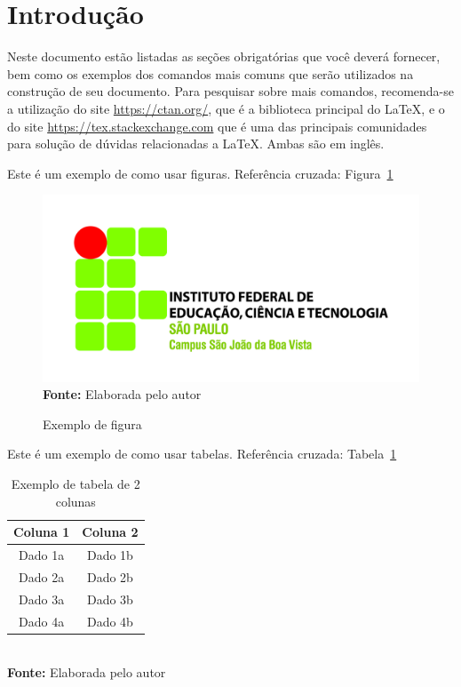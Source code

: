 \documentclass[
	article,			%
	11pt,				%
	oneside,			%
	a4paper,			%
	chapter=TITLE,		%
	section=TITLE,		%
	english,			%
	brazil,				%
	sumario=tradicional
]{abntex2}
\begin{document}
	\section{Introdução}
	
    Neste documento estão listadas as seções obrigatórias que você deverá fornecer, bem como os exemplos dos comandos mais comuns que serão utilizados na construção de seu documento. Para pesquisar sobre mais comandos, recomenda-se a utilização do site \url{https://ctan.org/}, que é a biblioteca principal do \LaTeX, e o do site \url{https://tex.stackexchange.com} que é uma das principais comunidades para solução de dúvidas relacionadas a \LaTeX. Ambas são em inglês.
    
	Este é um exemplo de como usar figuras. Referência cruzada: Figura~\ref{fig:exemplo}
	
	\FloatBarrier
	\begin{figure}[!htbp]
		\centering
		\caption{Exemplo de figura}
		\includegraphics[scale=1.5]{imagens/exemploFigura}
		\\\textbf{Fonte:} Elaborada pelo autor
		\label{fig:exemplo}
	\end{figure}
	\FloatBarrier
	
	
	Este é um exemplo de como usar tabelas. Referência cruzada: Tabela~\ref{tab:exemplo}
	
	\FloatBarrier
	\begin{table}[!htbp]
		\centering
		\caption{Exemplo de tabela de 2 colunas}
		\begin{tabular}{ c | c }
			\hline
			\textbf{Coluna 1} & \textbf{Coluna 2} \\ \hline
			Dado 1a           & Dado 1b           \\ \hline
			Dado 2a           & Dado 2b           \\ \hline
			Dado 3a           & Dado 3b           \\ \hline
			Dado 4a           & Dado 4b           \\ \hline
		\end{tabular}
		\\ \vspace{0.2cm}
		\textbf{Fonte:} Elaborada pelo autor
		\label{tab:exemplo}
	\end{table}
	\FloatBarrier
	
\end{document}
